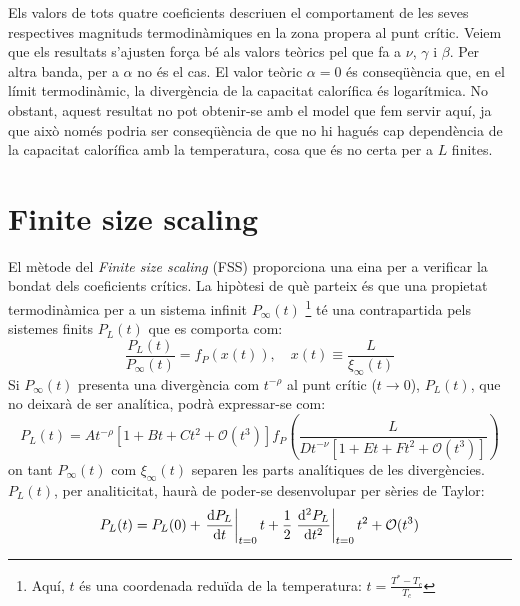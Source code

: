 \documentclass[a4paper]{article}
\begin{document}
Els valors de tots quatre coeficients descriuen el comportament de les seves respectives magnituds termodinàmiques en la zona propera al punt crític. Veiem que els resultats s'ajusten força bé als valors teòrics pel que fa a $\nu$, $\gamma$ i $\beta$. Per altra banda, per a $\alpha$ no és el cas. El valor teòric $\alpha=0$ és conseqüència que, en el límit termodinàmic, la divergència de la capacitat calorífica és logarítmica. No obstant, aquest resultat no pot obtenir-se amb el model que fem servir aquí, ja que això només podria ser conseqüència de que no hi hagués cap dependència de la capacitat calorífica amb la temperatura, cosa que és no certa per a $L$ finites.

\section{Finite size scaling}

El mètode del \textit{Finite size scaling} (FSS) proporciona una eina per a verificar la bondat dels coeficients crítics. La hipòtesi de què parteix és que una propietat termodinàmica per a un sistema infinit $P_\infty (t)$ \footnote{Aquí, $t$ és una coordenada reduïda de la temperatura: $t = \frac{T^* - T_c}{T_c}$} té una contrapartida pels sistemes finits $P_L (t)$ que es comporta com:
\begin{equation*}
    \frac{P_L(t)}{P_\infty (t)} = f_P \left(x(t) \right), \quad x(t) \equiv \frac{L}{\xi_\infty (t)}
\end{equation*}
Si $P_\infty (t)$ presenta una divergència com $t^{-\rho}$ al punt crític ($t \to 0$), $P_L (t)$, que no deixarà de ser analítica, podrà expressar-se com:
\begin{equation*}
    P_L (t) = A t^{-\rho}\left[ 1 + Bt + Ct^2 + \mathcal{O}(t^3) \right] f_P \left( \frac{L}{D t^{-\nu} \left[ 1 + Et + Ft^2 + \mathcal{O}(t^3) \right]} \right)
\end{equation*}
on tant $P_\infty (t)$ com $\xi_\infty (t)$ separen les parts analítiques de les divergències. $P_L (t)$, per analiticitat, haurà de poder-se desenvolupar per sèries de Taylor:
\begin{equation*}
    P_L (t) = P_L (0) + \left.\dv{P_L}{t} \right|_{t=0} t + \frac{1}{2} \left.\dv[2]{P_L}{t} \right|_{t=0} t^2 + \mathcal{O}(t^3)
\end{equation*}
\end{document}

